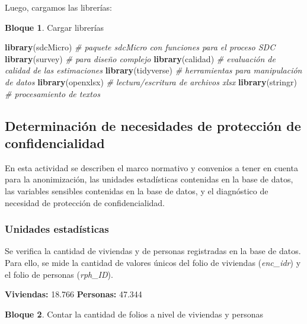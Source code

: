 \documentclass[]{book}
\newenvironment{Shaded}{\begin{snugshade}}{\end{snugshade}}
\newcommand{\CommentTok}[1]{\textcolor[rgb]{0.56,0.35,0.01}{\textit{#1}}}
\newcommand{\KeywordTok}[1]{\textcolor[rgb]{0.13,0.29,0.53}{\textbf{#1}}}
\newcommand{\NormalTok}[1]{#1}
\theoremstyle{definition}
\theoremstyle{definition}
\newtheorem{example}{Bloque}[chapter]
\theoremstyle{definition}
\theoremstyle{definition}
\theoremstyle{remark}
\begin{document}
Luego, cargamos las librerías:

\begin{example}
\protect\hypertarget{exm:bloque5nbm}{}{\label{exm:bloque5nbm} }Cargar librerías
\end{example}

\begin{Shaded}
\begin{Highlighting}[]
\KeywordTok{library}\NormalTok{(sdcMicro)  }\CommentTok{# paquete sdcMicro con funciones para el proceso SDC}
\KeywordTok{library}\NormalTok{(survey)    }\CommentTok{# para diseño complejo}
\KeywordTok{library}\NormalTok{(calidad)   }\CommentTok{# evaluación de calidad de las estimaciones}
\KeywordTok{library}\NormalTok{(tidyverse) }\CommentTok{# herramientas para manipulación de datos}
\KeywordTok{library}\NormalTok{(openxlsx)  }\CommentTok{# lectura/escritura de archivos xlsx}
\KeywordTok{library}\NormalTok{(stringr) }\CommentTok{# procesamiento de textos}
\end{Highlighting}
\end{Shaded}

\hypertarget{determinaciuxf3n-de-necesidades-de-protecciuxf3n-de-confidencialidad}{%
\subsection{Determinación de necesidades de protección de confidencialidad}\label{determinaciuxf3n-de-necesidades-de-protecciuxf3n-de-confidencialidad}}

En esta actividad se describen el marco normativo y convenios a tener en cuenta para la anonimización, las unidades estadísticas contenidas en la base de datos, las variables sensibles contenidas en la base de datos, y el diagnóstico de necesidad de protección de confidencialidad.

\hypertarget{unidades-estaduxedsticas}{%
\subsubsection{Unidades estadísticas}\label{unidades-estaduxedsticas}}

Se verifica la cantidad de viviendas y de personas registradas en la base de datos. Para ello, se mide la cantidad de valores únicos del folio de viviendas (\emph{enc\_idr}) y el folio de personas (\emph{rph\_ID}).

\textbf{Viviendas:} 18.766
\textbf{Personas:} 47.344

\begin{example}
\protect\hypertarget{exm:bloque6nbm}{}{\label{exm:bloque6nbm} }Contar la cantidad de folios a nivel de viviendas y personas
\end{example}
\end{document}
